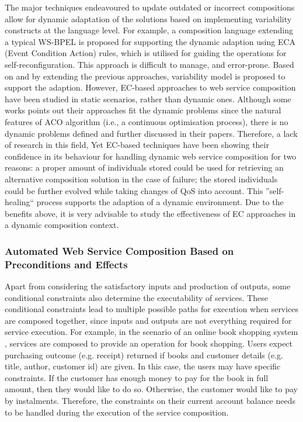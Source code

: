 The major techniques \cite{andrews2003business,baresi2011self,koning2009vxbpel} endeavoured to update outdated or incorrect compositions allow for dynamic adaptation of the solutions based on implementing variability constructs at the language level. For example, a composition language extending a typical WS-BPEL \cite{andrews2003business} is proposed for supporting the dynamic adaption using ECA (Event Condition Action) rules, which is utilised for guiding the operations for self-reconfiguration. This approach is difficult to manage, and error-prone. Based on and by extending the previous approaches, variability model \cite{alferez2014dynamic} is proposed to support the adaption. However, EC-based approaches to web service composition have been studied in static scenarios, rather than dynamic ones. Although some works \cite{feng2013dynamic,liu2005dynamic} points out their approaches fit the dynamic problems since the natural features of ACO algorithm (i.e., a continuous optimisation process), there is no dynamic problems defined and further discussed in their papers. Therefore, a lack of research in this field, Yet EC-based techniques have been showing their confidence in its behaviour for handling dynamic web service composition for two reasons: a proper amount of individuals stored could be used for retrieving an alternative composition solution in the case of failure; the stored individuals could be further evolved while taking changes of QoS into account. This ''self-healing`` process supports the adaption of a dynamic environment. Due to the benefits above, it is very advisable to study the effectiveness of EC approaches in a dynamic composition context.


\subsubsection{Automated Web Service Composition Based on Preconditions and Effects}
Apart from considering the satisfactory inputs and production of outputs, some conditional constraints also determine the executability of services.  These conditional constraints lead to multiple possible paths for execution when services are composed together, since inputs and outputs are not everything required for service execution. For example, in the scenario of an online book shopping system \cite{wang2014automated}, services are composed to provide an operation for book shopping.  Users expect purchasing outcome (e.g. receipt) returned if books and customer details (e.g. title, author, customer id) are given. In this case, the users may have specific constraints. If the customer has enough money to pay for the book in full amount, then they would like to do so. Otherwise, the customer would like to pay by instalments. Therefore, the constraints on their current account balance needs to be handled during the execution of the service composition.

